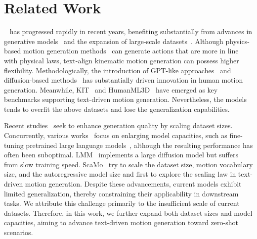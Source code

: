 \section{Related Work}
\label{sec:related_work}
~\citep{plappert2018learning, text2action, dvgans, jl2p, t2g, motionclip, temos, avatarclip, tm2t, motiondiffuse, teach, mdm, humanise, mld, mofusion, physdiff, yang2024egochoir, t2mgpt, diffprior, remodiffuse, gmd, motionclr, motiongpt, motiongptv2, unihsi, omnicontrol, humantomato, tlcontrol, momask, promotion, amd, b2ahdm, emdm, stmc, flowmdm, move, stablemofusion, zhang2024generative, ji2023stylevr, ji2025sport, Ji_2025_CVPR, xu2023actformer, xu2024regennet, dai2024motionlcm, xiao2025motionstreamer, fan2024freemotion, dai2025towards, feng2024motionwavelet, wan2024tlcontrol, zhou2024emdm, chen2024pay, cong2024laserhuman, yu2025hero} has progressed rapidly in recent years, benefiting substantially from advances in generative models~\citep{ddim, ddpm1, ddpm2, attention} and the expansion of large-scale datasets~\citep{motionx,interx,humanml3d}. 
Although physics-based motion generation methods~\citep{huang2025modskill, pan2025tokenhsi, dou2023c, pan2024synthesizing, wang2025sims, yu2025skillmimic, wang2025skillmimic} can generate actions that are more in line with physical laws, text-align kinematic motion generation can possess higher flexibility.
Methodologically, the introduction of GPT-like approaches~\citep{t2mgpt, humantomato, momask, motiongpt} and diffusion-based methods~\citep{mdm, motiondiffuse, remodiffuse,emdm,mld,motionlcm} has substantially driven innovation in human motion generation. Meanwhile, KIT~\citep{kit} and HumanML3D~\citep{humanml3d} have emerged as key benchmarks supporting text-driven motion generation. Nevertheless, the models tends to overfit the above datasets and lose the generalization capabilities. 

 Recent studies~\citep{motionx,interx,omg} seek to enhance generation quality by scaling dataset sizes. Concurrently, various works~\citep{motiongpt, motiongptv2, wu2024motionllm, avatargpt, wang2024quo, zhang2024large} focus on enlarging model capacities, such as fine-tuning pretrained large language models~\citep{motiongpt, motiongptv2, wu2024motionllm, avatargpt, wang2024quo}, although the resulting performance has often been suboptimal. LMM~\citep{zhang2024large} implements a large diffusion model but suffers from slow training speed. ScaMo~\citep{lu2024scamo} try to scale the dataset size, motion vocabulary size, and the autoregressive model size and first to explore the scaling law in text-driven motion generation. Despite these advancements, current models exhibit limited generalization, thereby constraining their applicability in downstream tasks. We attribute this challenge primarily to the insufficient scale of current datasets. Therefore, in this work, we further expand both dataset sizes and model capacities, aiming to advance text-driven motion generation toward zero-shot scenarios.